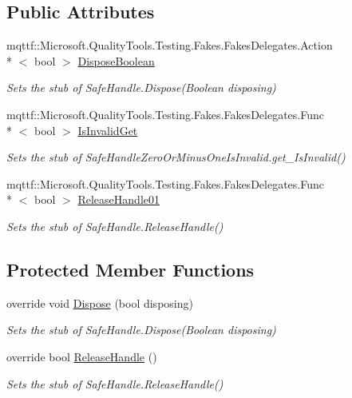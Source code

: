 \subsection*{Public Attributes}
\begin{DoxyCompactItemize}
\item 
mqttf\-::\-Microsoft.\-Quality\-Tools.\-Testing.\-Fakes.\-Fakes\-Delegates.\-Action\\*
$<$ bool $>$ \hyperlink{class_system_1_1_runtime_1_1_interop_services_1_1_fakes_1_1_stub_safe_buffer_a0a613d1d1f1a530299cbb3bb5cef69f8}{Dispose\-Boolean}
\begin{DoxyCompactList}\small\item\em Sets the stub of Safe\-Handle.\-Dispose(\-Boolean disposing)\end{DoxyCompactList}\item 
mqttf\-::\-Microsoft.\-Quality\-Tools.\-Testing.\-Fakes.\-Fakes\-Delegates.\-Func\\*
$<$ bool $>$ \hyperlink{class_system_1_1_runtime_1_1_interop_services_1_1_fakes_1_1_stub_safe_buffer_a072ee2586b9c4b7c95c07bf1e82f2147}{Is\-Invalid\-Get}
\begin{DoxyCompactList}\small\item\em Sets the stub of Safe\-Handle\-Zero\-Or\-Minus\-One\-Is\-Invalid.\-get\-\_\-\-Is\-Invalid()\end{DoxyCompactList}\item 
mqttf\-::\-Microsoft.\-Quality\-Tools.\-Testing.\-Fakes.\-Fakes\-Delegates.\-Func\\*
$<$ bool $>$ \hyperlink{class_system_1_1_runtime_1_1_interop_services_1_1_fakes_1_1_stub_safe_buffer_afdeec0cc1516104d93d0839e5465f72c}{Release\-Handle01}
\begin{DoxyCompactList}\small\item\em Sets the stub of Safe\-Handle.\-Release\-Handle()\end{DoxyCompactList}\end{DoxyCompactItemize}
\subsection*{Protected Member Functions}
\begin{DoxyCompactItemize}
\item 
override void \hyperlink{class_system_1_1_runtime_1_1_interop_services_1_1_fakes_1_1_stub_safe_buffer_aa788066e6dbfa287b8a5cbff226b64db}{Dispose} (bool disposing)
\begin{DoxyCompactList}\small\item\em Sets the stub of Safe\-Handle.\-Dispose(\-Boolean disposing)\end{DoxyCompactList}\item 
override bool \hyperlink{class_system_1_1_runtime_1_1_interop_services_1_1_fakes_1_1_stub_safe_buffer_a9d58f5cebff4b6feb1efd1a91b468364}{Release\-Handle} ()
\begin{DoxyCompactList}\small\item\em Sets the stub of Safe\-Handle.\-Release\-Handle()\end{DoxyCompactList}\end{DoxyCompactItemize}
